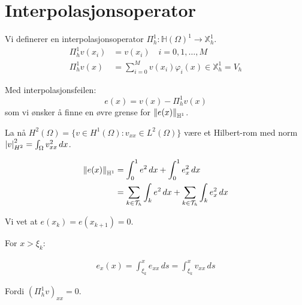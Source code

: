 \section{Interpolasjonsoperator}
\label{sec:interpolasjonsoperator}
Vi definerer en interpolasjonsoperator $\Pi_h^1: \mathbb{H}(\Omega)^1 \to \mathbb{X}_h^1$.
\begin{align*}
    \Pi_h^1 v(x_i) & = v(x_i) \quad i = 0, 1, \ldots, M                          \\
    \Pi_h^1 v(x)   & = \sum_{i=0}^M v(x_i) \varphi_i(x) \in \mathbb{X}_h^1 = V_h
\end{align*}

Med interpolasjonsfeilen:
\[
    e(x) = v(x) - \Pi_h^1 v(x)
\]
som vi ønsker å finne en øvre grense for \(\norm*{e(x)}_{\mathbb{H}^1} \).

La nå $H^2(\Omega) = \{v \in H^1(\Omega) : v_{xx} \in L^2(\Omega)\}$ være et Hilbert-rom med norm $\abs*{v}_{H^2}^2 = \int_\Omega v_{xx}^2 \, dx$.

\begin{align*}
    \norm*{e(x)}_{\mathbb{H}^1} & = \int_0^1 e^2 \, dx + \int_0^1 e_x^2 \, dx                                                   \\
                                & = \sum_{k\in\mathcal{T}_h} \int_{k} e^2 \, dx + \sum_{k\in\mathcal{T}_h} \int_{k} e_x^2 \, dx
\end{align*}

Vi vet at $e(x_k) = e(x_{k+1}) = 0$.

For $x > \xi_k$:

\begin{align*}
    e_x(x) = \int_{\xi_k}^x e_{xx} \, ds = \int_{\xi_k}^x v_{xx} \, ds
\end{align*}

Fordi $(\Pi_h^1 v)_{xx} = 0$.

